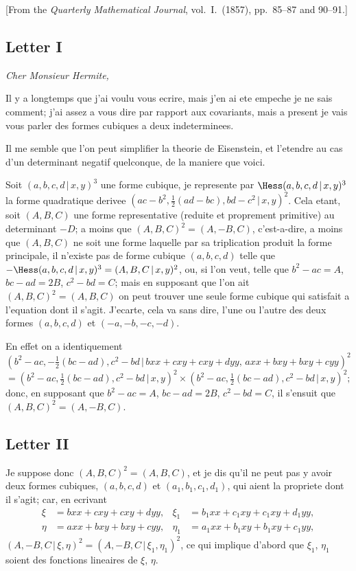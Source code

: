 \documentclass[11pt,a4paper]{book}
\begin{document}
[From the \textit{Quarterly Mathematical Journal}, vol.~I.\ (1857), pp.~85--87 and 90--91.]

\subsection*{Letter I}

\textit{Cher Monsieur Hermite,}

Il y a longtemps que j'ai voulu vous ecrire, mais j'en ai ete empeche je ne sais comment; j'ai assez a vous dire par rapport aux covariants, mais a present je vais vous parler des formes cubiques a deux indeterminees.

Il me semble que l'on peut simplifier la theorie de Eisenstein, et l'etendre au cas d'un determinant negatif quelconque, de la maniere que voici.

Soit $(a,b,c,d \,|\, x,y)^3$ une forme cubique, je represente par $\Hess(a,b,c,d \,|\, x,y)^3$ la forme quadratique derivee $(ac-b^2, \frac12(ad-bc), bd-c^2 \,|\, x,y)^2$. Cela etant, soit $(A,B,C)$ une forme representative (reduite et proprement primitive) au determinant $-D$; a moins que $(A,B,C)^2 = (A,-B,C)$, c'est-a-dire, a moins que $(A,B,C)$ ne soit une forme laquelle par sa triplication produit la forme principale, il n'existe pas de forme cubique $(a,b,c,d)$ telle que $-\Hess(a,b,c,d \,|\, x,y)^3 = (A,B,C \,|\, x,y)^2$, ou, si l'on veut, telle que $b^2-ac = A$, $bc-ad = 2B$, $c^2-bd = C$; mais en supposant que l'on ait $(A,B,C)^2 = (A,B,C)$ on peut trouver une seule forme cubique qui satisfait a l'equation dont il s'agit. J'ecarte, cela va sans dire, l'une ou l'autre des deux formes $(a,b,c,d)$ et $(-a,-b,-c,-d)$.

En effet on a identiquement
\[
(b^2-ac, -\tfrac12(bc-ad), c^2-bd \,|\, bxx + cxy + cxy + dyy, \, axx + bxy + bxy + cyy)^2
\]
\[
= (b^2-ac, \tfrac12(bc-ad), c^2-bd \,|\, x,y)^2 \times (b^2-ac, \tfrac12(bc-ad), c^2-bd \,|\, x,y)^2;
\]
donc, en supposant que $b^2-ac = A$, $bc-ad = 2B$, $c^2-bd = C$, il s'ensuit que $(A,B,C)^2 = (A,-B,C)$.

\subsection*{Letter II}

Je suppose donc $(A,B,C)^2 = (A,B,C)$, et je dis qu'il ne peut pas y avoir deux formes cubiques, $(a,b,c,d)$ et $(a_1,b_1,c_1,d_1)$, qui aient la propriete dont il s'agit; car, en ecrivant
\begin{align*}
\xi &= bxx + cxy + cxy + dyy, & \xi_1 &= b_1 xx + c_1 xy + c_1 xy + d_1 yy, \\
\eta &= axx + bxy + bxy + cyy, & \eta_1 &= a_1 xx + b_1 xy + b_1 xy + c_1 yy,
\end{align*}
$(A,-B,C \,|\, \xi,\eta)^2 = (A,-B,C \,|\, \xi_1,\eta_1)^2$, ce qui implique d'abord que $\xi_1$, $\eta_1$ soient des fonctions lineaires de $\xi$, $\eta$.
\end{document}
